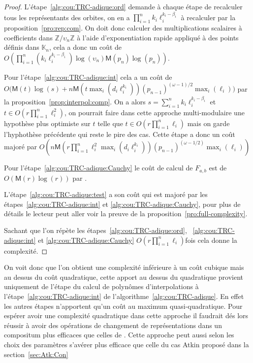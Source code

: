 \documentclass[10pt,a4paper]{book}
\theoremstyle{plain}
\theoremstyle{definition}
\theoremstyle{definition}
\theoremstyle{definition}
\theoremstyle{definition}
\theoremstyle{remark}
\theoremstyle{remark}
\theoremstyle{definition}
\begin{document}
\begin{proof}
L'étape~\ref{alg:cou:TRC-adique:ord} demande à chaque étape de recalculer tous les 
représentants des orbites, on en a $\prod_{i=1}^n k_i\ell_i^{k_i-\beta_i}$ 
à recalculer par la proposition~\ref{pro:rep:com}. 
On doit donc calculer des multiplications scalaires à coefficients dans 
$\mathbb{Z}/\upsilon_n \mathbb{Z}$ à l'aide d'exponentiation rapide appliqué à
des points définis dans $\mathbb{K}_n$, cela a donc un coût de  
$O(\prod_{i=1}^n (k_i\ell_i^{k_i-\beta_i})\log(\upsilon_n) \mathsf{M}(p_n)\log(p_n))$.

Pour l'étape~\ref{alg:cou:TRC-adique:int} cela a un coût de 
$O\bigl(\mathsf{M}(t)\log(s) + n\mathsf{M}(t \max_i(d_i\ell_i^{k_i}))(p_{n-1})^{(\omega-1)/2} \max_{i}(\ell_{i})\bigr)$ 
 par la proposition~\ref{prop:interpol:comp}. On a alors 
 $s=\sum_{i=1}^nk_i\ell_i^{k_i-\beta_i}$ et $t \in O(r \prod_{i=1}^n\ell_i^{2})$, on 
 pourrait faire dans cette approche multi-modulaire une hypothèse plus 
 optimiste sur $t$ telle que $t \in O(r \prod_{i=1}^n\ell_i)$ mais on garde 
 l'hyphothèse précédente qui reste le pire des cas. Cette étape a donc un coût 
 majoré par 
 $O(n\mathsf{M}(r \prod_{i=1}^n \ell_i^2 \max_i(d_i \ell_i^{k_i}))(p_{n-1})^{(\omega-1/2)}\max_i(\ell_i))$

Pour l'étape~\ref{alg:cou:TRC-adique:Cauchy} le coût de calcul de $F_{a,b}$ est de 
$O(\mathsf{M}(r)\log(r))$ par \cite[Théorème 7.5]{algeff17}.

L'étape~\ref{alg:cou:TRC-adique:test} a son coût qui est majoré par les 
étapes~\ref{alg:cou:TRC-adique:int} et \ref{alg:cou:TRC-adique:Cauchy}, pour plus de 
détails le lecteur peut aller voir la preuve de la 
proposition~\ref{pro:full-complexity}.

Sachant que l'on répète les étapes~\ref{alg:cou:TRC-adique:ord}, 
~\ref{alg:cou:TRC-adique:int} et \ref{alg:cou:TRC-adique:Cauchy}  $O(r \prod_{i=1}^n\ell_i)$fois cela donne la 
complexité.
\end{proof}
On voit donc que l'on obtient une complexité inférieure à un coût cubique mais 
au dessus du coût quadratique, cette apport au dessus du quadratique provient
uniquement de l'étape du calcul de polynômes d'interpolations à 
l'étape~\ref{alg:cou:TRC-adique:int} de l'algorithme~\ref{alg:cou:TRC-adique}. 
En effet les autres étapes n'apportent qu'un coût au maximum quasi-quadratique. 
Pour espérer avoir une complexité quadratique dans cette approche il faudrait 
dés lors réussir à avoir des opérations de changement de représentations dans 
un compositum plus efficaces que celles de \cite{DeFeoDoliskaniSchost14}. Cette
approche peut aussi selon les choix des paramètres s'avérer plus efficace que
celle du cas Atkin proposé dans la section~\ref{sec:Atk:Con}
\end{document}
